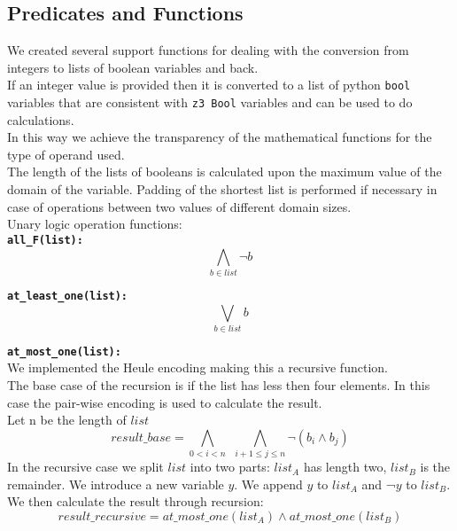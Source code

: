 
\subsection{Predicates and Functions}\label{subsec:predicates}
  We created several support functions for dealing with the conversion from integers to lists of
  boolean variables and back.\\
  If an integer value is provided then it is converted to a list of python \texttt{bool} variables
  that are consistent with 
  \texttt{z3 Bool} variables and can be used to do calculations.\\
  In this way we achieve the transparency of the mathematical functions for the type of operand 
  used.\\
  The length of the lists of booleans is calculated upon the maximum value of the domain of the
  variable. Padding of the shortest list is performed if necessary in case of operations between
  two values of different domain sizes. \\

  Unary logic operation functions:\\
  \texttt{\textbf{all\_F(list):}} 
  \begin{equation}
      \bigwedge\limits_{b \in list}\neg b
  \end{equation}

  \texttt{\textbf{at\_least\_one(list):}}
  \begin{equation}
          \bigvee\limits_{b \in list} b
  \end{equation}

  \texttt{\textbf{at\_most\_one(list):}}\\
  We implemented the Heule encoding making this a recursive function.\\
  The base case of the recursion is if the list has less then four elements. In this case the 
  pair-wise encoding is used to calculate the result.\\
  Let n be the length of $list$
  \begin{equation}
          result\_base = \bigwedge\limits_{0 < i < n} \ \ \bigwedge\limits_{i+1 \leq j \leq n}\neg (b_i \wedge b_j)
  \end{equation}
  In the recursive case we split $list$ into two parts: $list_A$ has length two, $list_B$ is
  the remainder. We introduce a new variable $y$. We append $y$ to $list_A$ and ¬$y$ to 
  $list_B$. We then calculate the result through recursion:
  \begin{equation}
      result\_recursive = at\_most\_one(list_A) \wedge at\_most\_one(list_B)
  \end{equation}

